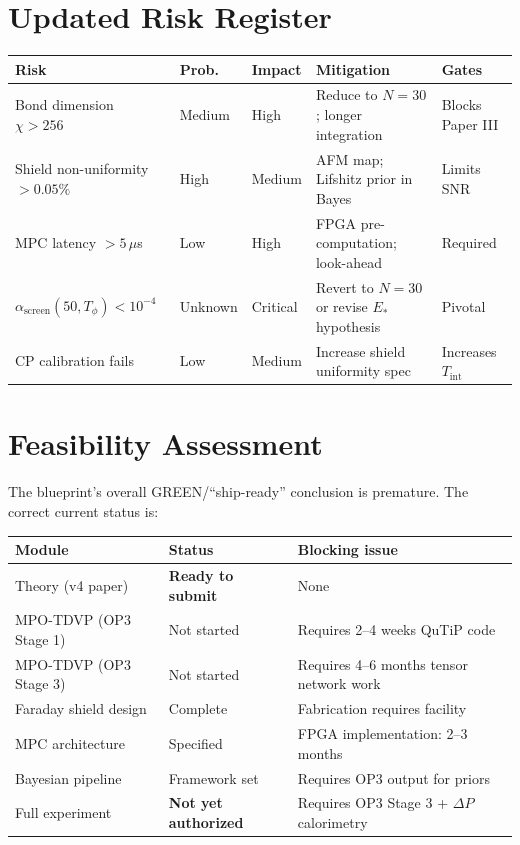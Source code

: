 \documentclass[11pt,letterpaper]{article}
\newcommand{\asc}{\alpha_{\mathrm{screen}}}
\begin{document}
\section{Updated Risk Register}

\begin{center}\small
\begin{tabular}{@{}p{3cm}p{1.5cm}p{1.5cm}p{4.5cm}p{2.5cm}@{}}
\toprule
Risk & Prob. & Impact & Mitigation & Gates \\
\midrule
Bond dimension $\chi > 256$ & Medium & High & Reduce to $N=30$; longer integration & Blocks Paper III \\
Shield non-uniformity $>0.05\%$ & High & Medium & AFM map; Lifshitz prior in Bayes & Limits SNR \\
MPC latency $> 5\,\mu$s & Low & High & FPGA pre-computation; look-ahead & Required \\
$\asc(50,T_\phi) < 10^{-4}$ & Unknown & Critical & Revert to $N=30$ or revise $E_*$ hypothesis & Pivotal \\
CP calibration fails & Low & Medium & Increase shield uniformity spec & Increases $T_{\mathrm{int}}$ \\
\bottomrule
\end{tabular}
\end{center}

\section{Feasibility Assessment}

The blueprint's overall GREEN/``ship-ready'' conclusion is premature.  The correct
current status is:

\begin{center}\small
\begin{tabular}{@{}p{4cm}p{3cm}p{5.5cm}@{}}
\toprule
Module & Status & Blocking issue \\
\midrule
Theory (v4 paper) & \textbf{Ready to submit} & None \\
MPO-TDVP (OP3 Stage 1) & Not started & Requires 2--4 weeks QuTiP code \\
MPO-TDVP (OP3 Stage 3) & Not started & Requires 4--6 months tensor network work \\
Faraday shield design & Complete & Fabrication requires facility \\
MPC architecture & Specified & FPGA implementation: 2--3 months \\
Bayesian pipeline & Framework set & Requires OP3 output for priors \\
Full experiment & \textbf{Not yet authorized} & Requires OP3 Stage 3 + $\Delta P$ calorimetry \\
\bottomrule
\end{tabular}
\end{center}
\end{document}
